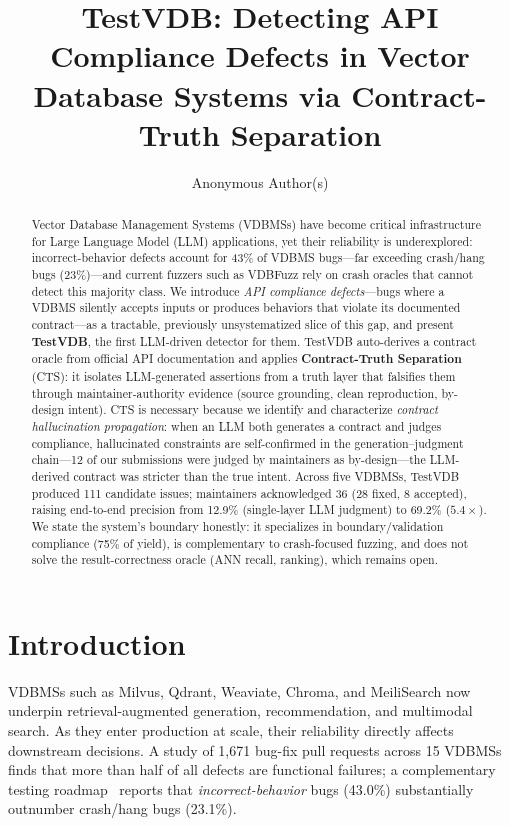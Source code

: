 \documentclass[sigconf, anonymous, review]{acmart}
\title{TestVDB: Detecting API Compliance Defects in Vector Database Systems via Contract-Truth Separation}
\author{Anonymous Author(s)}
\affiliation{\institution{Anonymized for review}}
\begin{document}
\begin{abstract}
Vector Database Management Systems (VDBMSs) have become critical infrastructure for Large Language Model (LLM) applications, yet their reliability is underexplored: incorrect-behavior defects account for 43\% of VDBMS bugs---far exceeding crash/hang bugs (23\%)---and current fuzzers such as VDBFuzz rely on crash oracles that cannot detect this majority class. We introduce \emph{API compliance defects}---bugs where a VDBMS silently accepts inputs or produces behaviors that violate its documented contract---as a tractable, previously unsystematized slice of this gap, and present \textbf{TestVDB}, the first LLM-driven detector for them. TestVDB auto-derives a contract oracle from official API documentation and applies \textbf{Contract-Truth Separation} (CTS): it isolates LLM-generated assertions from a truth layer that falsifies them through maintainer-authority evidence (source grounding, clean reproduction, by-design intent). CTS is necessary because we identify and characterize \emph{contract hallucination propagation}: when an LLM both generates a contract and judges compliance, hallucinated constraints are self-confirmed in the generation--judgment chain---12 of our submissions were judged by maintainers as by-design---the LLM-derived contract was stricter than the true intent. Across five VDBMSs, TestVDB produced 111 candidate issues; maintainers acknowledged 36 (28 fixed, 8 accepted), raising end-to-end precision from 12.9\% (single-layer LLM judgment) to 69.2\% ($5.4\times$). We state the system's boundary honestly: it specializes in boundary/validation compliance (75\% of yield), is complementary to crash-focused fuzzing, and does not solve the result-correctness oracle (ANN recall, ranking), which remains open.
\end{abstract}

\maketitle

\section{Introduction}\label{sec:intro}

VDBMSs such as Milvus, Qdrant, Weaviate, Chroma, and MeiliSearch now underpin retrieval-augmented generation, recommendation, and multimodal search. As they enter production at scale, their reliability directly affects downstream decisions. A study of 1{,}671 bug-fix pull requests across 15 VDBMSs~\cite{bugstudy25} finds that more than half of all defects are functional failures; a complementary testing roadmap~\cite{roadmap25} reports that \emph{incorrect-behavior} bugs (43.0\%) substantially outnumber crash/hang bugs (23.1\%).
\end{document}
